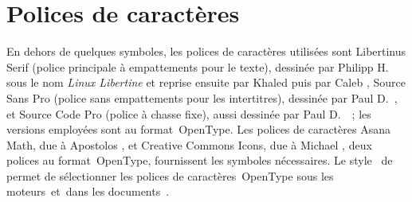 \section{Polices de caractères}

En dehors de quelques symboles, les polices de caractères utilisées sont
Libertinus Serif (police principale à empattements pour le texte), dessinée
par Philipp H.~\citet{Poll} sous le nom \emph{Linux Libertine} et reprise
ensuite par Khaled \citet{Hosny} puis par Caleb \citet{Maclennan}, Source
Sans Pro (police sans empattements pour les inter\-titres), dessinée par
Paul D.~\citet{HuntSans}, et Source Code Pro (police à chasse fixe), aussi
dessinée par Paul D.~\citet{HuntCode}~; les versions employées sont au
format~OpenType.
Les polices de caractères Asana Math, due à Apostolos \citet{Syropoulos15},
et Creative Commons Icons, due à Michael \citet{Ummels}, deux polices au
format~OpenType, fournissent les symboles nécessaires.
Le style~ de \citet{Fontspec} permet de sélectionner les
polices de caractères~OpenType sous les moteurs~\Xetex et~\Luatex dans les
documents~\Latex.
